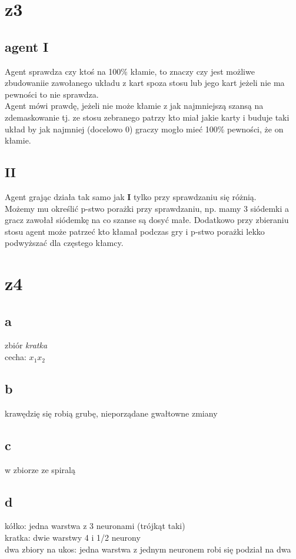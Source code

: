 \documentclass{article}
\begin{document}
\section{z3}
\subsection*{agent I}
Agent sprawdza czy ktoś na 100\% kłamie, to znaczy czy jest możliwe zbudowaniie zawołanego układu z kart spoza stosu lub jego kart jeżeli nie ma pewności to nie sprawdza. \\Agent mówi prawdę, jeżeli nie może kłamie z jak najmniejszą szansą na zdemaskowanie tj. ze stosu zebranego patrzy kto miał jakie karty i buduje taki układ by jak najmniej (docelowo 0) graczy mogło mieć 100\% pewności, że on kłamie.
\subsection*{II}
Agent grając działa tak samo jak \textbf{I} tylko przy sprawdzaniu się różnią.\\
Możemy mu określić p-stwo porażki przy sprawdzaniu, np. mamy 3 siódemki a gracz zawołał siódemkę na co szanse są dosyć małe. Dodatkowo przy zbieraniu stosu agent może patrzeć kto kłamał podczas gry i p-stwo porażki lekko podwyższać dla częstego kłamcy.
\section{z4}
\subsection*{a}
zbiór \textit{kratka}\\ cecha: $x_1x_2$
\subsection*{b}
krawędzię się robią grubę, nieporządane gwałtowne zmiany
\subsection*{c}
w zbiorze ze spiralą
\subsection*{d}
kółko: jedna warstwa z 3 neuronami (trójkąt taki)\\
kratka: dwie warstwy 4 i 1/2 neurony\\
dwa zbiory na ukos: jedna warstwa z jednym neuronem robi się podział na dwa\\
\end{document}
